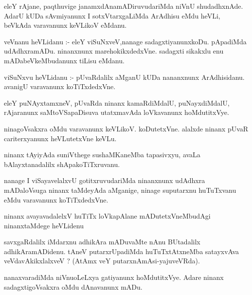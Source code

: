 \documentclass{article}
\begin{document}
\begin{mn}
eleY rAjane, paqthuvige janamxdAnamADiruvudariMda niVnU shudadhxnAde.  
AdarU kUDa sAvmiyanunx I sotxVtarxgaLiMda ArAdhisu eMdu heVLi, beVkAda 
varavanunx keVLikoV eMdanu.
\end{mn}

\begin{mn}
veVnanu heVLidanu :- eleY viSuNxveV,nanage sadagxtiyanunxkoDu.  pApadiMda  udAdhxramADu.  
ninanxnunx marehokikxdedxVne.  sadagxti sikakxlu enu mADabeVkeMbudanunx  tiLisu eMdanu.                                                                   
\end{mn}

\begin{mn}
viSuNxvu heVLidanu :- pUvaRdalilx aMganU kUDa nananxnunx ArAdhisidanu.  avanigU varavanunx koTiTxdedxVne.
\end{mn}

\begin{mn}
eleY puNAyxtamxneV,  pUvaRda ninanx kamaRdiMdalU,  puNayxdiMdalU, rAjaranunx 
saMtoVSapaDisuva utatxmavAda loVkavanunx hoMdutitxVye.
\end{mn}

\begin{mn}
ninagoVsakxra oMdu varavanunx  keVLikoV.  koDutetxVne. alalxde ninanx pUvaR 
cariterxyanunx heVLutetxVne keVLu.
\end{mn}

\begin{mn}
ninanx tAyiyAda suniVthege sushaMKaneMba tapasivxyu, avaLa bAlayxtanadalilx shApakoTiTxruvanu.
\end{mn}

\begin{mn}
nanage I viSayavelalxvU gotitxruvudariMda ninanxnunx udAdhxra mADaloVsuga 
ninanx taMdeyAda aMganige, ninage suputarxnu huTuTxvanu eMdu varavanunx  koTiTxdedxVne. 
\end{mn}

\begin{mn}
ninanx avayavadalelxV huTiTx loVkapAlane mADutetxVneMbudAgi ninanxtaMdege heVLidenu
\end{mn}

\begin{mn}
savxgaRdalilx iMdarxnu adhikAra mADuvaMte nAnu BUtadalilx adhikAramADidenu.  tAneV putarxrUpadiMda 
huTuTxtAtxneMba satayxvAva veVdavAkikxlalxveV ?  (AtAmx veY putarxnAmAsi-yajuveVRda).
\end{mn}

\begin{mn}
nanaxvaradiMda niVnuoLeLxya gatiyanunx hoMdutitxVye. Adare ninanx sadagxtigoVsakxra  oMdu dAnavanunx mADu.
\end{mn}
\end{document}

